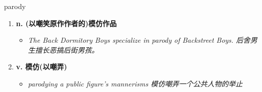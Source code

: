 
\begin{frame}
{\huge parody}
\begin{center}
\begin{enumerate}\Large
  \item \textbf{n. (以嘲笑原作作者的)模仿作品}
  \begin{itemize}
    \item \em{\Large{The Back Dormitory Boys specialize in parody of Backstreet Boys. 后舍男生擅长恶搞后街男孩。}}
  \end{itemize}
  \item \textbf{v. 模仿(以嘲弄)}
  \begin{itemize}
    \item \em{\Large{parodying a public figure's mannerisms 模仿嘲弄一个公共人物的举止}}
  \end{itemize}
\end{enumerate}
\end{center}
\end{frame}
